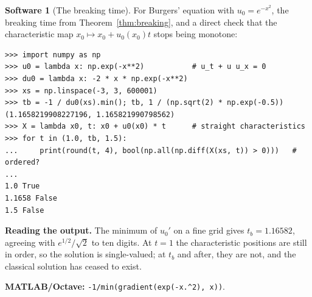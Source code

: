 \documentclass[11pt,a4paper]{article}
\numberwithin{equation}{section}
\theoremstyle{definition}
\newtheorem{software}[thm]{Software}
\begin{document}
\begin{software}[The breaking time]
\label{sw:breaking}
For Burgers' equation with $u_0 = e^{-x^2}$, the breaking time from Theorem~\ref{thm:breaking}, and a direct check that the characteristic map $x_0 \mapsto x_0 + u_0(x_0)t$ stops being monotone:
{\small\begin{verbatim}
>>> import numpy as np
>>> u0 = lambda x: np.exp(-x**2)           # u_t + u u_x = 0
>>> du0 = lambda x: -2 * x * np.exp(-x**2)
>>> xs = np.linspace(-3, 3, 600001)
>>> tb = -1 / du0(xs).min(); tb, 1 / (np.sqrt(2) * np.exp(-0.5))
(1.1658219908227196, 1.165821990798562)
>>> X = lambda x0, t: x0 + u0(x0) * t      # straight characteristics
>>> for t in (1.0, tb, 1.5):
...     print(round(t, 4), bool(np.all(np.diff(X(xs, t)) > 0)))   # ordered?
...
1.0 True
1.1658 False
1.5 False
\end{verbatim}}
\textbf{Reading the output.} The minimum of $u_0'$ on a fine grid gives $t_b = 1.16582$, agreeing with $e^{1/2}/\sqrt2$ to ten digits. At $t = 1$ the characteristic positions are still in order, so the solution is
single-valued; at $t_b$ and after, they are not, and the classical solution has ceased to exist.

\textbf{MATLAB/Octave:} \texttt{-1/min(gradient(exp(-x.\^{}2), x))}.
\end{software}
\end{document}
